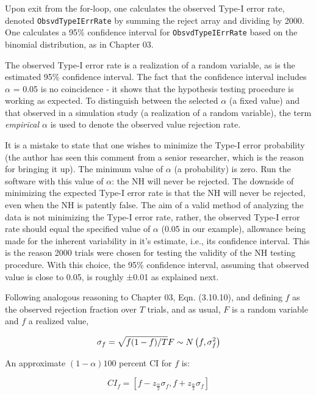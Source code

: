 \documentclass[
]{book}
\begin{document}
Upon exit from the for-loop, one calculates the observed Type-I error rate, denoted \texttt{ObsvdTypeIErrRate} by summing the reject array and dividing by 2000. One calculates a 95\% confidence interval for \texttt{ObsvdTypeIErrRate} based on the binomial distribution, as in Chapter 03.

The observed Type-I error rate is a realization of a random variable, as is the estimated 95\% confidence interval. The fact that the confidence interval includes \(\alpha\) = 0.05 is no coincidence - it shows that the hypothesis testing procedure is working as expected. To distinguish between the selected \(\alpha\) (a fixed value) and that observed in a simulation study (a realization of a random variable), the term \emph{empirical \(\alpha\)} is used to denote the observed value rejection rate.

It is a mistake to state that one wishes to minimize the Type-I error probability (the author has seen this comment from a senior researcher, which is the reason for bringing it up). The minimum value of \(\alpha\) (a probability) is zero. Run the software with this value of \(\alpha\): the NH will never be rejected. The downside of minimizing the expected Type-I error rate is that the NH will never be rejected, even when the NH is patently false. The aim of a valid method of analyzing the data is not minimizing the Type-I error rate, rather, the observed Type-I error rate should equal the specified value of \(\alpha\) (0.05 in our example), allowance being made for the inherent variability in it's estimate, i.e., its confidence interval. This is the reason 2000 trials were chosen for testing the validity of the NH testing procedure. With this choice, the 95\% confidence interval, assuming that observed value is close to 0.05, is roughly ±0.01 as explained next.

Following analogous reasoning to Chapter 03, Eqn. (3.10.10), and defining \(f\) as the observed rejection fraction over \(T\) trials, and as usual, \(F\) is a random variable and \(f\) a realized value,

\begin{equation*} 
\sigma_f = \sqrt{f(1-f)/T}\\
F \sim N\left ( f,\sigma_{f}^{2} \right )
\end{equation*}

An approximate \((1-\alpha)100\) percent CI for \(f\) is:

\begin{equation*} 
{CI}_f = \left [ f-z_{\frac{\alpha}{2}}\sigma_f, f+z_{\frac{\alpha}{2}}\sigma_f \right ]
\end{equation*}
\end{document}

